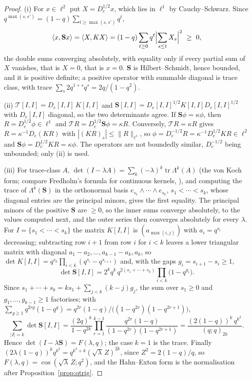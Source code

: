 \documentclass[11pt]{article}
\theoremstyle{plain}
\theoremstyle{definition}
\theoremstyle{remark}
\begin{document}
\begin{proof}
(i) For $x\in\ell^2$ put $X=D_e^{1/2}x$, which lies in $\ell^1$ by Cauchy--Schwarz. Since
$q^{\max(s,s')}=(1-q)\sum_{t\ge\max(s,s')}q^t$,
\[
   \langle x,\mathbf Sx\rangle=\langle X,KX\rangle
   =(1-q)\sum_{t\ge0}q^t\Bigl|\sum_{s\le t}X_s\Bigr|^2\ \ge\ 0,
\]
the double sums converging absolutely, with equality only if every partial sum of $X$ vanishes,
that is $X=0$, that is $x=0$. $\mathbf S$ is Hilbert--Schmidt, hence bounded, and it is positive
definite; a positive operator with summable diagonal is trace class, with trace
$\sum_s2q^{1+s}q^s=2q/(1-q^2)$.

(ii) $\mathcal T[I,I]=D_e[I,I]\,K[I,I]$ and $\mathbf S[I,I]=D_e[I,I]^{1/2}K[I,I]D_e[I,I]^{1/2}$
with $D_e[I,I]$ diagonal, so the two determinants agree. If $\mathbf S\phi=\kappa\phi$, then
$R=D_e^{1/2}\phi\in\ell^1$ and $\mathcal TR=D_e^{1/2}\mathbf S\phi=\kappa R$. Conversely,
$\mathcal TR=\kappa R$ gives $R=\kappa^{-1}D_e(KR)$ with $|(KR)_s|\le\|R\|_{\ell^1}$, so
$\phi=D_e^{-1/2}R=\kappa^{-1}D_e^{1/2}KR\in\ell^2$ and
$\mathbf S\phi=D_e^{1/2}KR=\kappa\phi$. The operators are not boundedly similar, $D_e^{-1/2}$ being
unbounded; only \textup{(ii)} is used.

(iii) For trace-class $A$, $\det(I-\lambda A)=\sum_k(-\lambda)^k\operatorname{tr}\Lambda^k(A)$
\cite[Ch.~3]{Simon} (the von Koch form; compare Fredholm's formula for continuous kernels,
\cite[Thm.~3.10]{Simon}), and computing the trace of $\Lambda^k(\mathbf
S)$ in the orthonormal basis $e_{s_1}\wedge\cdots\wedge e_{s_k}$, $s_1<\cdots<s_k$, whose diagonal
entries are the principal minors, gives the first equality. The principal minors of the positive
$\mathbf S$ are $\ge0$, so the inner sums converge absolutely, to the values computed next, and the
outer series then converges absolutely for every $\lambda$. For $I=\{s_1<\cdots<s_k\}$ the matrix $K[I,I]$ is $(a_{\max(i,j)})$ with
$a_i=q^{s_i}$ decreasing; subtracting row $i+1$ from row $i$ for $i<k$ leaves a lower triangular
matrix with diagonal $a_1-a_2,\dots,a_{k-1}-a_k,a_k$, so
$\det K[I,I]=q^{s_k}\prod_{i<k}(q^{s_i}-q^{s_{i+1}})$ and, with the gaps
$g_i=s_{i+1}-s_i\ge1$,
\[
   \det\mathbf S[I,I]=2^kq^k\,q^{2(s_1+\cdots+s_k)}\prod_{i<k}\bigl(1-q^{g_i}\bigr).
\]
Since $s_1+\cdots+s_k=ks_1+\sum_{j<k}(k-j)g_j$, the sum over $s_1\ge0$ and $g_1,\dots,g_{k-1}\ge1$
factorises; with $\sum_{g\ge1}q^{2rg}(1-q^g)=q^{2r}(1-q)/\bigl((1-q^{2r})(1-q^{2r+1})\bigr)$,
\[
   \sum_{|I|=k}\det\mathbf S[I,I]
   =\frac{(2q)^k}{1-q^{2k}}\prod_{r=1}^{k-1}\frac{q^{2r}(1-q)}{(1-q^{2r})(1-q^{2r+1})}
   =\frac{(2(1-q))^k\,q^{k^2}}{(q;q)_{2k}} .
\]
Hence $\det(I-\lambda\mathbf S)=F(\lambda,q)$; the case $k=1$ is the trace. Finally
$(2\lambda(1-q))^kq^{k^2}=q^{k^2+k}(\sqrt\lambda\,Z)^{2k}$, since $Z^2=2(1-q)/q$, so
$F(\lambda,q)=\cos(\sqrt\lambda\,Z;q^2)$, and the Hahn--Exton form is the normalisation after
Proposition~\ref{prop:qtrig}.


\end{proof}
\end{document}
